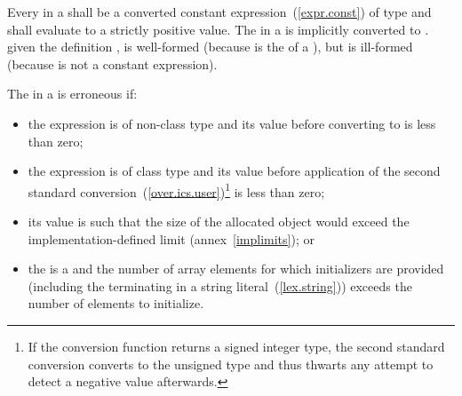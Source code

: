 \pnum
Every  in a
 shall be a converted constant
expression~(\ref{expr.const}) of type  and
shall evaluate to a strictly positive value.
%
The  in a is
implicitly converted to .
\enterexample
given the definition ,
 is well-formed (because  is the
 of a ), but
 is ill-formed (because  is not a
constant expression).
\exitexample 

\pnum
{}%
The  in a  is
erroneous if:

\begin{itemize}
\item
the expression is of non-class type and its value before converting to
 is less than zero;

\item
the expression is of class type and its value before application of the second
standard conversion~(\ref{over.ics.user})\footnote{If the conversion function
returns a signed integer type, the second standard conversion converts to the
unsigned type  and thus thwarts any attempt to detect a
negative value afterwards.} is less than zero;

\item
its value is such that the size of the allocated object would exceed the
implementation-defined limit (annex~\ref{implimits}); or

\item
the  is a  and the
number of array elements for which initializers are provided (including the
terminating  in a string literal~(\ref{lex.string})) exceeds the
number of elements to initialize.
\end{itemize}

